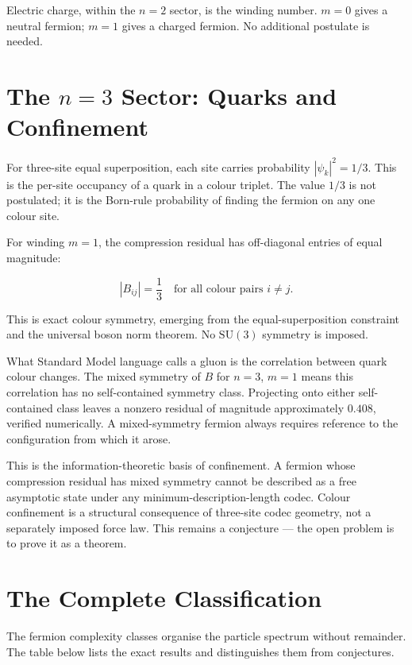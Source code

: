 Electric charge, within the $n = 2$ sector, is the winding number.
$m = 0$ gives a neutral fermion; $m = 1$ gives a charged fermion. No
additional postulate is needed.

\section{The $n = 3$ Sector: Quarks and Confinement}

For three-site equal superposition, each site carries probability
$|\psi_k|^2 = 1/3$. This is the per-site occupancy of a quark in a
colour triplet. The value $1/3$ is not postulated; it is the Born-rule
probability of finding the fermion on any one colour site.

For winding $m = 1$, the compression residual has off-diagonal entries
of equal magnitude:

\[
|B_{ij}| = \frac{1}{3} \quad \text{for all colour pairs } i \neq j.
\]

This is exact colour symmetry, emerging from the equal-superposition
constraint and the universal boson norm theorem. No $\mathrm{SU}(3)$
symmetry is imposed.

What Standard Model language calls a gluon is the correlation between
quark colour changes. The mixed symmetry of $B$ for $n = 3$, $m = 1$
means this correlation has no self-contained symmetry class. Projecting
onto either self-contained class leaves a nonzero residual of magnitude
approximately $0.408$, verified numerically. A mixed-symmetry fermion
always requires reference to the configuration from which it arose.

This is the information-theoretic basis of confinement. A fermion whose
compression residual has mixed symmetry cannot be described as a free
asymptotic state under any minimum-description-length codec. Colour
confinement is a structural consequence of three-site codec geometry,
not a separately imposed force law. This remains a conjecture --- the
open problem is to prove it as a theorem.

\section{The Complete Classification}

The fermion complexity classes organise the particle spectrum without
remainder. The table below lists the exact results and distinguishes
them from conjectures.

